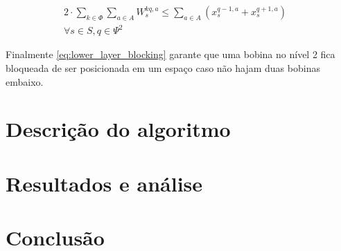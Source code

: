 \documentclass[journal]{IEEEtran}
\begin{document}
        \begin{align}
            2 \cdot \sum_{k \in \Phi} \sum_{a \in A} W_s^{kq,a} \leq \sum_{a \in A} (x_s^{q-1,a} + x_s^{q+1,a}) \quad \\
            \forall s \in S, q \in \Psi^2
            \label{eq:lower_layer_blocking}
        \end{align}

        Finalmente \ref{eq:lower_layer_blocking} garante que uma bobina no nível 2 fica 
        bloqueada de ser posicionada em um espaço caso não hajam duas bobinas 
        embaixo. 
    \section{Descrição do algoritmo}


        
    \section{Resultados e análise}


    
    \section{Conclusão}            
    
    
\end{document}
